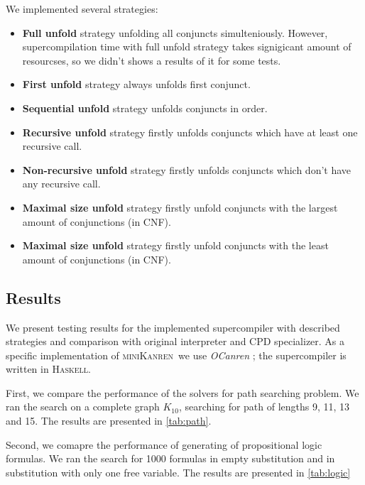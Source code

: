 \documentclass[submission,copyright,creativecommons]{eptcs}
\newcommand{\miniKanren}{\textsc{miniKanren}\ }
\begin{document}
We implemented several strategies:
\begin{itemize}
\item {\bf Full unfold} strategy unfolding all conjuncts simulteniously.
      However, supercompilation time with full unfold strategy takes signigicant amount of resourcses, so
      we didn't shows a results of it for some tests.
\item {\bf First unfold} strategy always unfolds first conjunct.
\item {\bf Sequential unfold} strategy unfolds conjuncts in order.
\item {\bf Recursive unfold} strategy firstly unfolds conjuncts which have at least one recursive call.
\item {\bf Non-recursive unfold} strategy firstly unfolds conjuncts which don't have any recursive call.
\item {\bf Maximal size unfold} strategy firstly unfold conjuncts with the largest amount of conjunctions (in CNF).
\item {\bf Maximal size unfold} strategy firstly unfold conjuncts with the least amount of conjunctions (in CNF).
\end{itemize}

\subsection{Results}

We present testing results for the implemented supercompiler with described strategies and comparison with
original interpreter and CPD specializer.  As a specific implementation of \miniKanren we use {\it OCanren} \cite{ocanren};
the supercompiler is written in \textsc{Haskell}.

First, we compare the performance of the solvers for path searching problem. We ran the search on a complete graph $K_{10}$,
searching for path of lengths 9, 11, 13 and 15. The results are presented in \ref{tab:path}.

Second, we comapre the performance of generating of propositional logic formulas. We ran the search for 1000 formulas
in empty substitution and in substitution with only one free variable. The results are presented in \ref{tab:logic}
\end{document}

